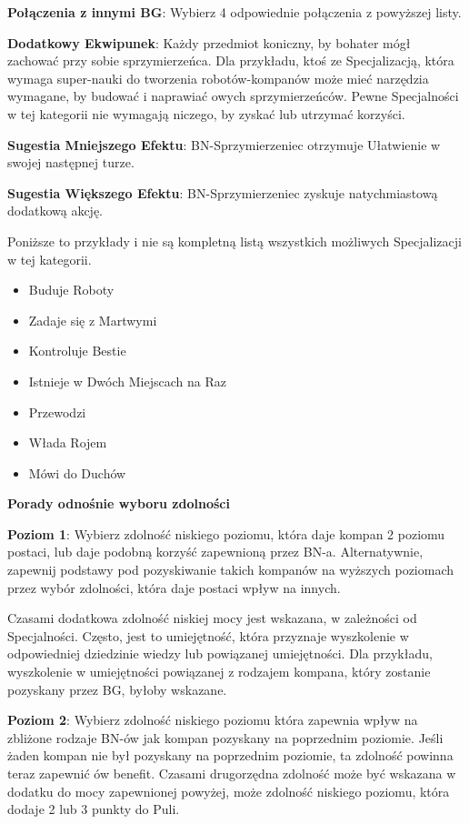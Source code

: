 \textbf{Połączenia z innymi BG}: Wybierz 4 odpowiednie połączenia z powyższej listy.

\textbf{Dodatkowy Ekwipunek}: Każdy przedmiot koniczny, by bohater mógł zachować przy sobie sprzymierzeńca. Dla przykładu, ktoś ze Specjalizacją, która wymaga super-nauki do tworzenia robotów-kompanów może mieć narzędzia wymagane, by budować i naprawiać owych sprzymierzeńców. Pewne Specjalności w tej kategorii nie wymagają niczego, by zyskać lub utrzymać korzyści.

\textbf{Sugestia Mniejszego Efektu}: BN-Sprzymierzeniec otrzymuje Ułatwienie w swojej następnej turze.

\textbf{Sugestia Większego Efektu}: BN-Sprzymierzeniec zyskuje natychmiastową dodatkową akcję.

Poniższe to przykłady i nie są kompletną listą wszystkich możliwych Specjalizacji w tej kategorii.

\begin{itemize}
\item  Buduje Roboty
\item  Zadaje się z Martwymi
\item  Kontroluje Bestie
\item  Istnieje w Dwóch Miejscach na Raz
\item  Przewodzi
\item  Włada Rojem
\item Mówi do Duchów
\end{itemize}    

\textbf{Porady odnośnie wyboru zdolności}

\textbf{Poziom 1}: Wybierz zdolność niskiego poziomu, która daje kompan 2 poziomu postaci, lub daje podobną korzyść zapewnioną przez BN-a. Alternatywnie, zapewnij podstawy pod pozyskiwanie takich kompanów na wyższych poziomach przez wybór zdolności, która daje postaci wpływ na innych.

Czasami dodatkowa zdolność niskiej mocy jest wskazana, w zależności od Specjalności. Często, jest to umiejętność, która przyznaje wyszkolenie w odpowiedniej dziedzinie wiedzy lub powiązanej umiejętności. Dla przykładu, wyszkolenie w umiejętności powiązanej z rodzajem kompana, który zostanie pozyskany przez BG, byłoby wskazane. 

\textbf{Poziom 2}: Wybierz zdolność niskiego poziomu która zapewnia wpływ na zbliżone rodzaje BN-ów jak kompan pozyskany na poprzednim poziomie. Jeśli żaden kompan nie był pozyskany na poprzednim poziomie, ta zdolność powinna teraz zapewnić ów benefit. Czasami drugorzędna zdolność może być wskazana w dodatku do mocy zapewnionej powyżej, może zdolność niskiego poziomu, która dodaje 2 lub 3 punkty do Puli.

